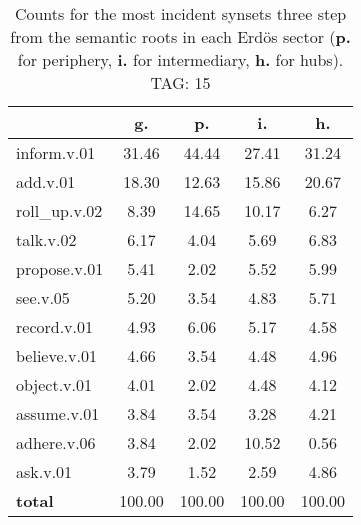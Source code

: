 \begin{table}[h!]
\begin{center}
\begin{tabular}{| l || c | c | c | c |}\hline
 & {\bf g.} & {\bf p.} & {\bf i.} & {\bf h.} \\\hline\hline
inform.v.01 & 31.46  & 44.44  & 27.41  & 31.24 \\\hline
add.v.01 & 18.30  & 12.63  & 15.86  & 20.67 \\\hline
roll\_up.v.02 & 8.39  & 14.65  & 10.17  & 6.27 \\\hline
talk.v.02 & 6.17  & 4.04  & 5.69  & 6.83 \\\hline
propose.v.01 & 5.41  & 2.02  & 5.52  & 5.99 \\\hline
see.v.05 & 5.20  & 3.54  & 4.83  & 5.71 \\\hline
record.v.01 & 4.93  & 6.06  & 5.17  & 4.58 \\\hline
believe.v.01 & 4.66  & 3.54  & 4.48  & 4.96 \\\hline
object.v.01 & 4.01  & 2.02  & 4.48  & 4.12 \\\hline
assume.v.01 & 3.84  & 3.54  & 3.28  & 4.21 \\\hline
adhere.v.06 & 3.84  & 2.02  & 10.52  & 0.56 \\\hline
ask.v.01 & 3.79  & 1.52  & 2.59  & 4.86 \\\hline\hline
{{\bf total}} & 100.00  & 100.00  & 100.00  & 100.00 \\\hline
\end{tabular}
\caption{Counts for the most incident synsets three step from the semantic roots in each Erd\"os sector ({\bf p.} for periphery, {\bf i.} for intermediary, {\bf h.} for hubs). TAG: 15}
\end{center}
\end{table}